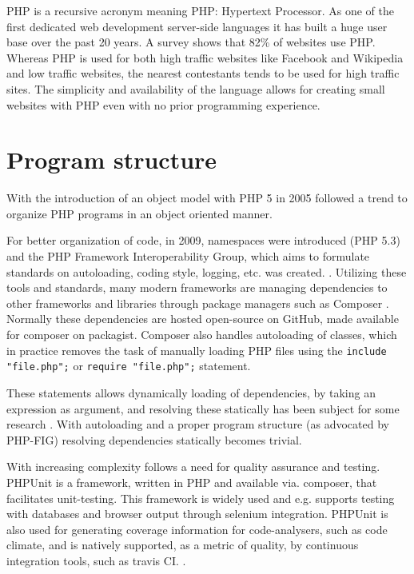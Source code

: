 PHP is a recursive acronym meaning PHP: Hypertext Processor. As one of the first dedicated web development server-side languages it has built a huge user base over the past 20 years. A survey shows that 82\% of websites use PHP. Whereas PHP is used for both high traffic websites like Facebook and Wikipedia and low traffic websites, the nearest contestants tends to be used for high traffic sites. The simplicity and availability of the language allows for creating small websites with PHP even with no prior programming experience. %
\section{Program structure}
With the introduction of an object model with PHP 5 in 2005 followed a trend to organize PHP programs in an object oriented manner. 

For better organization of code, in 2009, namespaces were introduced (PHP 5.3) and the PHP Framework Interoperability Group, which aims to formulate standards on autoloading, coding style, logging, etc. was created. . Utilizing these tools and standards, many modern frameworks are managing dependencies to other frameworks and libraries through package managers such as Composer . Normally these dependencies are hosted open-source on GitHub, made available for composer on packagist. Composer also handles autoloading of classes, which in practice removes the task of manually loading PHP files using the \texttt{include "file.php";} or \texttt{require "file.php";} statement. 

These statements allows dynamically loading of dependencies, by taking an expression as argument, and resolving these statically has been subject for some research . With autoloading and a proper program structure (as advocated by PHP-FIG) resolving dependencies statically becomes trivial.

With increasing complexity follows a need for quality assurance and testing. PHPUnit is a framework, written in PHP and available via. composer, that facilitates unit-testing. This framework is widely used and e.g. supports testing with databases and browser output through selenium integration. PHPUnit is also used for generating coverage information for code-analysers, such as code climate, and is natively supported, as a metric of quality, by continuous integration tools, such as travis CI. . 

